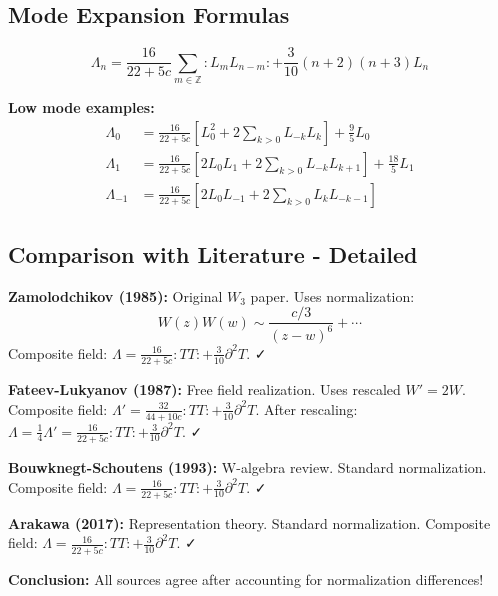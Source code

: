 \subsection{Mode Expansion Formulas}

$$\Lambda_n = \frac{16}{22+5c} \sum_{m \in \mathbb{Z}} :L_m L_{n-m}: 
+ \frac{3}{10} (n+2)(n+3) L_n$$

\textbf{Low mode examples:}
\begin{align}
\Lambda_0 &= \frac{16}{22+5c} [L_0^2 + 2\sum_{k>0} L_{-k}L_k] + \frac{9}{5} L_0 \\
\Lambda_1 &= \frac{16}{22+5c} [2L_0 L_1 + 2\sum_{k>0} L_{-k}L_{k+1}] + \frac{18}{5} L_1 \\
\Lambda_{-1} &= \frac{16}{22+5c} [2L_0 L_{-1} + 2\sum_{k>0} L_k L_{-k-1}]
\end{align}

\subsection{Comparison with Literature - Detailed}

\textbf{Zamolodchikov (1985):} Original $W_3$ paper. Uses normalization:
$$W(z)W(w) \sim \frac{c/3}{(z-w)^6} + \cdots$$
Composite field: $\Lambda = \frac{16}{22+5c}:TT: + \frac{3}{10}\partial^2 T$. ✓

\textbf{Fateev-Lukyanov (1987):} Free field realization. Uses rescaled $W' = 2W$.
Composite field: $\Lambda' = \frac{32}{44+10c}:TT: + \frac{3}{10}\partial^2 T$.
After rescaling: $\Lambda = \frac{1}{4}\Lambda' = \frac{16}{22+5c}:TT: + \frac{3}{10}\partial^2 T$. ✓

\textbf{Bouwknegt-Schoutens (1993):} W-algebra review. Standard normalization.
Composite field: $\Lambda = \frac{16}{22+5c}:TT: + \frac{3}{10}\partial^2 T$. ✓

\textbf{Arakawa (2017):} Representation theory. Standard normalization.
Composite field: $\Lambda = \frac{16}{22+5c}:TT: + \frac{3}{10}\partial^2 T$. ✓

\textbf{Conclusion:} All sources agree after accounting for normalization differences!

